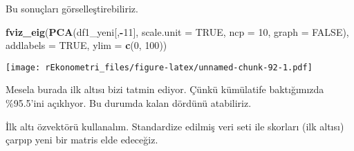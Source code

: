 \documentclass[
]{book}
\newenvironment{Shaded}{\begin{snugshade}}{\end{snugshade}}
\newcommand{\DataTypeTok}[1]{\textcolor[rgb]{0.13,0.29,0.53}{#1}}
\newcommand{\DecValTok}[1]{\textcolor[rgb]{0.00,0.00,0.81}{#1}}
\newcommand{\KeywordTok}[1]{\textcolor[rgb]{0.13,0.29,0.53}{\textbf{#1}}}
\newcommand{\NormalTok}[1]{#1}
\newcommand{\OperatorTok}[1]{\textcolor[rgb]{0.81,0.36,0.00}{\textbf{#1}}}
\newcommand{\OtherTok}[1]{\textcolor[rgb]{0.56,0.35,0.01}{#1}}
\newcommand{\StringTok}[1]{\textcolor[rgb]{0.31,0.60,0.02}{#1}}
\begin{document}
Bu sonuçları görselleştirebiliriz.

\begin{Shaded}
\begin{Highlighting}[]
\KeywordTok{fviz_eig}\NormalTok{(}\KeywordTok{PCA}\NormalTok{(df1_yeni[,}\OperatorTok{-}\DecValTok{11}\NormalTok{], }\DataTypeTok{scale.unit =} \OtherTok{TRUE}\NormalTok{, }\DataTypeTok{ncp =} \DecValTok{10}\NormalTok{, }\DataTypeTok{graph =} \OtherTok{FALSE}\NormalTok{), }\DataTypeTok{addlabels =} \OtherTok{TRUE}\NormalTok{, }\DataTypeTok{ylim =} \KeywordTok{c}\NormalTok{(}\DecValTok{0}\NormalTok{, }\DecValTok{100}\NormalTok{))}
\end{Highlighting}
\end{Shaded}

\texttt{[image: rEkonometri\_files/figure-latex/unnamed-chunk-92-1.pdf]}

Mesela burada ilk altısı bizi tatmin ediyor. Çünkü kümülatife baktığımızda \%95.5'ini açıklıyor. Bu durumda kalan dördünü atabiliriz.

İlk altı özvektörü kullanalım. Standardize edilmiş veri seti ile skorları (ilk altısı) çarpıp yeni bir matris elde edeceğiz.

\begin{Shaded}
\end{Shaded}
\end{document}
